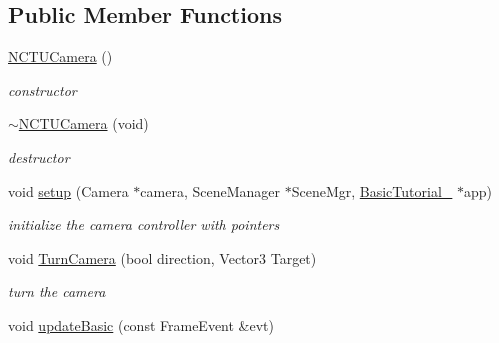 \subsection*{Public Member Functions}
\begin{DoxyCompactItemize}
\item 
\hyperlink{class_n_c_t_u_camera_a38abb4f6c1f26d057b67a5f4dc442f93}{N\+C\+T\+U\+Camera} ()\hypertarget{class_n_c_t_u_camera_a38abb4f6c1f26d057b67a5f4dc442f93}{}\label{class_n_c_t_u_camera_a38abb4f6c1f26d057b67a5f4dc442f93}

\begin{DoxyCompactList}\small\item\em constructor \end{DoxyCompactList}\item 
\hyperlink{class_n_c_t_u_camera_aa90b12d4bb1f0321b734b1e540876d01}{$\sim$\+N\+C\+T\+U\+Camera} (void)\hypertarget{class_n_c_t_u_camera_aa90b12d4bb1f0321b734b1e540876d01}{}\label{class_n_c_t_u_camera_aa90b12d4bb1f0321b734b1e540876d01}

\begin{DoxyCompactList}\small\item\em destructor \end{DoxyCompactList}\item 
void \hyperlink{class_n_c_t_u_camera_a759e64b0b2f3c582733599197d86bcd1}{setup} (Camera $\ast$camera, Scene\+Manager $\ast$Scene\+Mgr, \hyperlink{class_basic_tutorial__00}{Basic\+Tutorial\+\_} $\ast$app)\hypertarget{class_n_c_t_u_camera_a759e64b0b2f3c582733599197d86bcd1}{}\label{class_n_c_t_u_camera_a759e64b0b2f3c582733599197d86bcd1}

\begin{DoxyCompactList}\small\item\em initialize the camera controller with pointers \end{DoxyCompactList}\item 
void \hyperlink{class_n_c_t_u_camera_a94444f8dcbbf4de692d550bfa6ea4a85}{Turn\+Camera} (bool direction, Vector3 Target)\hypertarget{class_n_c_t_u_camera_a94444f8dcbbf4de692d550bfa6ea4a85}{}\label{class_n_c_t_u_camera_a94444f8dcbbf4de692d550bfa6ea4a85}

\begin{DoxyCompactList}\small\item\em turn the camera \end{DoxyCompactList}\item 
void \hyperlink{class_n_c_t_u_camera_ada78a54e693ae248bf210ec5412b1a96}{update\+Basic} (const Frame\+Event \&evt)\hypertarget{class_n_c_t_u_camera_ada78a54e693ae248bf210ec5412b1a96}{}\label{class_n_c_t_u_camera_ada78a54e693ae248bf210ec5412b1a96}


\end{DoxyCompactItemize}
